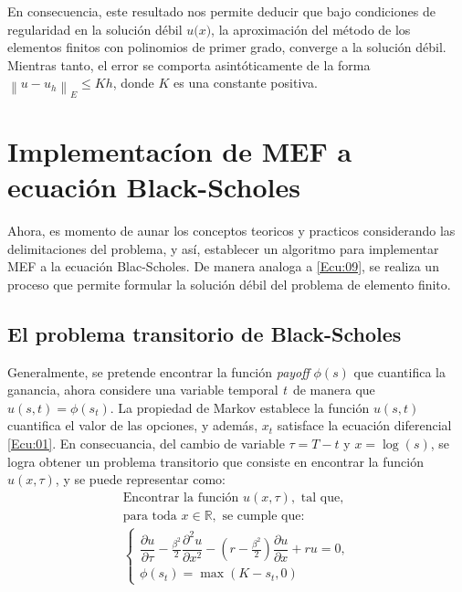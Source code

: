 \documentclass[12pt]{article}
\begin{document}
En consecuencia, este resultado nos permite deducir que bajo condiciones de regularidad en la solución débil $\textit{u(x)}$, la aproximación del método de los elementos finitos con polinomios de primer grado, converge a la solución débil. Mientras tanto, el error se comporta asintóticamente de la forma  $\left\|u- u_h\right \|_E \leq Kh$, donde $K$ es una constante positiva.
\section{Implementacíon de MEF a ecuación Black-Scholes}
Ahora, es momento de aunar los conceptos teoricos y practicos considerando las delimitaciones del problema, y así, establecer un algoritmo para implementar MEF a la ecuación Blac-Scholes. De manera analoga a \eqref{Ecu:09}, se realiza un proceso que permite formular la solución débil del problema de elemento finito.
\subsection{El problema transitorio de Black-Scholes}
Generalmente, se pretende encontrar la función \textit{payoff} $\phi(s)$ que cuantifica la ganancia, ahora considere una variable temporal \textit{t}\ de manera que $u(s,t)=\phi(s_t)$. La propiedad de Markov establece la función $u(s,t)$ cuantifica el valor de las opciones, y además, $x_t$ satisface la ecuación diferencial \eqref{Ecu:01}. En consecuancia, del cambio de variable $\tau=T-t$ y $x=\log(s)$, se logra obtener un problema transitorio que consiste en encontrar la función $u(x,\tau)$, y se puede representar como:
\begin{equation*}
\begin{array}{l}
\text{Encontrar la función }\textit{u}(x,\tau), \text{ tal que, }\\ 
\text{para toda } \textit{x}\in \mathbb{R}, \text{ se cumple que:}\\
\left\{
\begin{array}{l}
\dfrac{\partial{u}}{\partial{\tau}} - \frac{\beta^2}{2}\dfrac{\partial^2{u}}{\partial{x^2}}
- (r-\frac{\beta^2}{2})\dfrac{\partial{u}}{\partial{x}} +ru =0,\\[0.5cm]
\phi(s_t) = \max{(K-s_t,0)} 
\end{array}\right. 
\label{Ecu:29}
\end{array}
\end{equation*}
\end{document}
